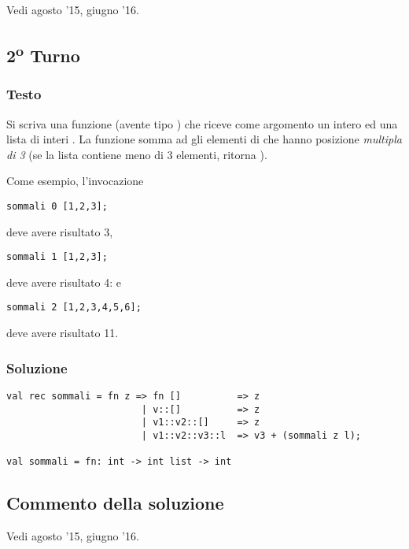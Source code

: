 Vedi agosto '15, giugno '16.


\subsection{2\textsuperscript{o} Turno}

\subsubsection{Testo}

Si scriva una funzione  (avente tipo ) che riceve come argomento un intero  ed una lista di interi .
La funzione  somma ad  gli elementi di  che hanno posizione \emph{multipla di 3} (se la lista contiene meno di 3 elementi,  ritorna ).

\medskip
Come esempio, l'invocazione

\begin{lstlisting}
sommali 0 [1,2,3];
\end{lstlisting}

deve avere risultato 3,

\begin{lstlisting}
sommali 1 [1,2,3];
\end{lstlisting}

deve avere risultato 4: e

\begin{lstlisting}
sommali 2 [1,2,3,4,5,6];
\end{lstlisting}

deve avere risultato 11.

\subsubsection{Soluzione}

\begin{lstlisting}[style = SML, caption = {[Definizione della funzione \sml{sommali} - 2\textsuperscript{o} Turno]Definizione della funzione \sml{sommali}}]
val rec sommali = fn z => fn []          => z
						| v::[]          => z
						| v1::v2::[]     => z
						| v1::v2::v3::l  => v3 + (sommali z l);

val sommali = fn: int -> int list -> int
\end{lstlisting}

\subsection{Commento della soluzione}

Vedi agosto '15, giugno '16.
